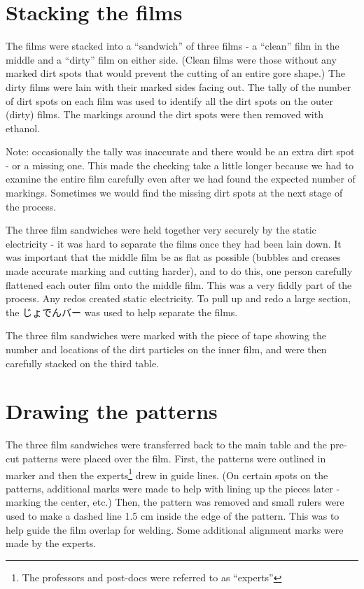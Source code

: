 \documentclass{article}
\begin{document}
\section{Stacking the films}
The films were stacked into a ``sandwich'' of three films - a ``clean'' film in the middle and a ``dirty'' film on either side. (Clean films were those without any marked dirt spots that would prevent the cutting of an entire gore shape.) The dirty films were lain with their marked sides facing out. 
The tally of the number of dirt spots on each film was used to identify all the dirt spots on the outer (dirty) films. The markings around the dirt spots were then removed with ethanol. 

Note: occasionally the tally was inaccurate and there would be an extra dirt spot - or a missing one. This made the checking take a little longer because we had to examine the entire film carefully even after we had found the expected number of markings. Sometimes we would find the missing dirt spots at the next stage of the process.

The three film sandwiches were held together very securely by the static electricity - it was hard to separate the films once they had been lain down. It was important that the middle film be as flat as possible (bubbles and creases made accurate marking and cutting harder), and to do this, one person carefully flattened each outer film onto the middle film. This was a very fiddly part of the process. Any redos created static electricity. To pull up and redo a large section, the じょでんバー was used to help separate the films. 

The three film sandwiches were marked with the piece of tape showing the number and locations of the dirt particles on the inner film, and were then carefully stacked on the third table. 


\section{Drawing the patterns} 
The three film sandwiches were transferred back to the main table and the pre-cut patterns were placed over the film. First, the patterns were outlined in marker and then the experts\footnote{The professors and post-docs were referred to as ``experts''} drew in guide lines. (On certain spots on the patterns, additional marks were made to help with lining up the pieces later - marking the center, etc.) Then, the pattern was removed and small rulers were used to make a dashed line 1.5 cm inside the edge of the pattern. This was to help guide the film overlap for welding. Some additional alignment marks were made by the experts. 
\end{document}
